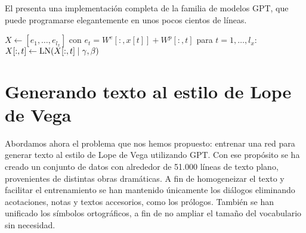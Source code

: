El  presenta una implementación completa de la familia de modelos GPT, que puede programarse elegantemente en unos pocos cientos de líneas.

\begin{algorithm}[tbph]
  \SetAlgoLined

  $X \gets [e_1, …, e_{l_x}]$ con $e_t = W^e[:, x[t]] + W^p[:, t]$\;
  para $t = 1, …, l_x$: $X[:, t] \gets \operatorname{LN}(X[:, t] \mid \gamma, \beta)$\;
  \caption{$\texttt{GPT}(x \mid \theta)$\cite{phuong2022formal}}
  \label{algo:gpt}
\end{algorithm}

\section{Generando texto al estilo de Lope de Vega}
Abordamos ahora el problema que nos hemos propuesto: entrenar una red para generar texto al estilo de Lope de Vega utilizando GPT. Con ese propósito se ha creado un conjunto de datos con alrededor de 51.000 líneas de texto plano, provenientes de distintas obras dramáticas. A fin de homogeneizar el texto y facilitar el entrenamiento se han mantenido únicamente los diálogos eliminando acotaciones, notas y textos accesorios, como los prólogos. También se han unificado los símbolos ortográficos, a fin de no ampliar el tamaño del vocabulario sin necesidad.

